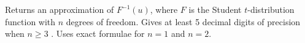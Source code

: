   \begin{tabb}
  Returns an approximation of $F^{-1}(u)$, where $F$ is the
  Student $t$-distribution function with $n$ degrees of freedom.
  Gives at least  5 decimal digits of precision when $n \ge 3$
  .
  Uses exact formulae for $n=1$ and $n=2$.
  \end{tabb}
\begin{code}\begin{hide}
}\end{hide}
\end{code}
